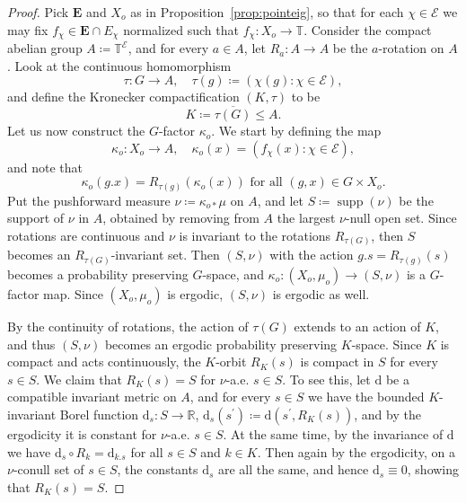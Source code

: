 \documentclass{amsart}
\numberwithin{equation}{subsection}
\theoremstyle{remark}
\begin{document}
\begin{proof}
Pick \(\mathbf{E}\) and \(X_{o}\) as in Proposition~\ref{prop:pointeig}, so that for each \(\chi\in\mathcal{E}\) we may fix \(f_{\chi}\in\mathbf{E}\cap E_{\chi}\) normalized such that \(f_{\chi}:X_{o}\to\mathbb{T}\). Consider the compact abelian group \(A\coloneqq \mathbb{T}^{\mathcal{E}}\), and for every \(a\in A\), let \(R_{a}:A\to A\) be the \(a\)-rotation on \(A\). Look at the continuous homomorphism
\[\tau:G\longrightarrow A,\quad\tau\left(g\right)\coloneqq \left(\chi\left(g\right):\chi\in\mathcal{E}\right),\]
and define the Kronecker compactification \(\left(K,\tau\right)\) to be
\[K\coloneqq \overline{\tau\left(G\right)}\leq A.\]
Let us now construct the \(G\)-factor \(\kappa_{o}\). We start by defining the map
\[\kappa_{o}:X_{o}\longrightarrow A,\quad\kappa_{o}\left(x\right)=\left(f_{\chi}\left(x\right):\chi\in\mathcal{E}\right),\]
and note that
\[\kappa_{o}\left(g.x\right)=R_{\tau\left(g\right)}\left(\kappa_{o}\left(x\right)\right)\text{ for all }\left(g,x\right)\in G\times X_{o}.\]
Put the pushforward measure \(\nu\coloneqq \kappa_{o\ast}\mu\) on \(A\), and let \(S\coloneqq \operatorname{supp}\left(\nu\right)\) be the support of \(\nu\) in \(A\), obtained by removing from \(A\) the largest \(\nu\)-null open set. Since rotations are continuous and \(\nu\) is invariant to the rotations \(R_{\tau\left(G\right)}\), then \(S\) becomes an \(R_{\tau\left(G\right)}\)-invariant set. Then \(\left(S,\nu\right)\) with the action \(g.s=R_{\tau\left(g\right)}\left(s\right)\) becomes a probability preserving \(G\)-space, and \(\kappa_{o}:\left(X_{o},\mu_{o}\right)\to\left(S,\nu\right)\) is a \(G\)-factor map. Since \(\left(X_{o},\mu_{o}\right)\) is ergodic, \(\left(S,\nu\right)\) is ergodic as well.

By the continuity of rotations, the action of \(\tau\left(G\right)\) extends to an action of \(K\), and thus \(\left(S,\nu\right)\) becomes an ergodic probability preserving \(K\)-space. Since \(K\) is compact and acts continuously, the \(K\)-orbit \(R_{K}\left(s\right)\) is compact in \(S\) for every \(s\in S\). We claim that \(R_{K}\left(s\right)=S\) for \(\nu\)-a.e. \(s\in S\). To see this, let \(\mathrm{d}\) be a compatible invariant metric on \(A\), and for every \(s\in S\) we have the bounded \(K\)-invariant Borel function \(\mathrm{d}_{s}:S\to\mathbb{R}\), \(\mathrm{d}_{s}\left(s^{\prime}\right)\coloneqq\mathrm{d}\left(s^{\prime},R_{K}\left(s\right)\right)\), and by the ergodicity it is constant for \(\nu\)-a.e. \(s\in S\). At the same time, by the invariance of \(\mathrm{d}\) we have \(\mathrm{d}_{s}\circ R_{k}=\mathrm{d}_{k.s}\) for all \(s\in S\) and \(k\in K\). Then again by the ergodicity, on a \(\nu\)-conull set of \(s\in S\), the constants \(\mathrm{d}_{s}\) are all the same, and hence \(\mathrm{d}_{s}\equiv 0\), showing that \(R_{K}\left(s\right)=S\).


\end{proof}
\end{document}
